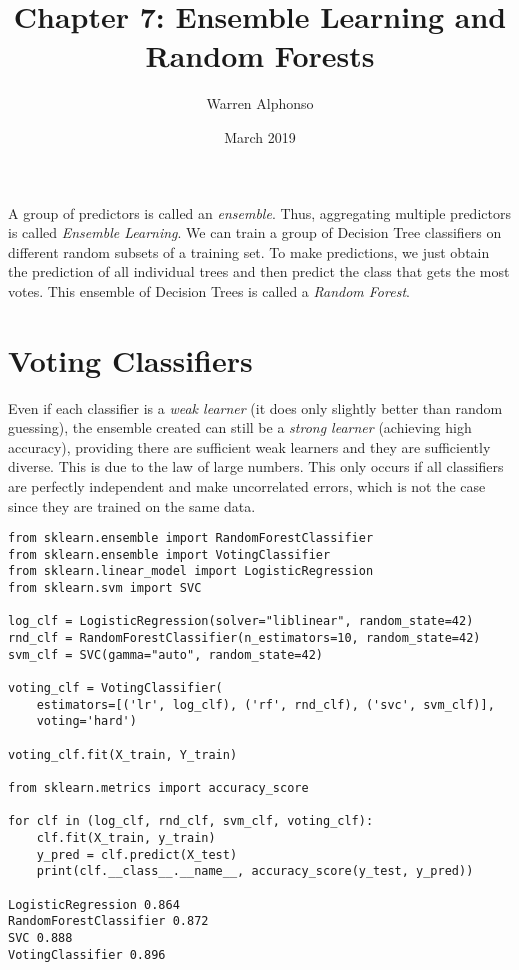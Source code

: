 \documentclass[letterpaper]{article}
\title{Chapter 7: Ensemble Learning and Random Forests}
\author{Warren Alphonso}
\date{March 2019}
\begin{document}
\maketitle

A group of predictors is called an \textsl{ensemble}. Thus, aggregating multiple predictors is called \textsl{Ensemble Learning}. We can train a group of Decision Tree classifiers on different random subsets of a training set. To make predictions, we just obtain the prediction of all individual trees and then predict the class that gets the most votes. This ensemble of Decision Trees is called a \textsl{Random Forest}. 

\section{Voting Classifiers}
Even if each classifier is a \textsl{weak learner} (it does only slightly better than random guessing), the ensemble created can still be a \textsl{strong learner} (achieving high accuracy), providing there are sufficient weak learners and they are sufficiently diverse. This is due to the law of large numbers. This only occurs if all classifiers are perfectly independent and make uncorrelated errors, which is not the case since they are trained on the same data. 

\begin{verbatim}
from sklearn.ensemble import RandomForestClassifier
from sklearn.ensemble import VotingClassifier
from sklearn.linear_model import LogisticRegression
from sklearn.svm import SVC

log_clf = LogisticRegression(solver="liblinear", random_state=42)
rnd_clf = RandomForestClassifier(n_estimators=10, random_state=42)
svm_clf = SVC(gamma="auto", random_state=42)

voting_clf = VotingClassifier(
    estimators=[('lr', log_clf), ('rf', rnd_clf), ('svc', svm_clf)],
    voting='hard')
    
voting_clf.fit(X_train, Y_train)

from sklearn.metrics import accuracy_score

for clf in (log_clf, rnd_clf, svm_clf, voting_clf):
    clf.fit(X_train, y_train)
    y_pred = clf.predict(X_test)
    print(clf.__class__.__name__, accuracy_score(y_test, y_pred))
    
LogisticRegression 0.864
RandomForestClassifier 0.872
SVC 0.888
VotingClassifier 0.896
\end{verbatim}
\end{document}

